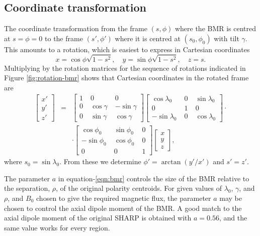 \subsection{Coordinate transformation}
The coordinate transformation from the frame $(s,\phi)$ where the BMR is centred at $s=\phi=0$ to the frame $(s',\phi')$ where it is centred at $(s_0,\phi_0)$ with tilt $\gamma$. This amounts to a rotation, which is easiest to express in Cartesian coordinates
\begin{equation}
x = \cos\phi\sqrt{1-s^2}, \quad y=\sin\phi\sqrt{1-s^2},\quad z=s.
\end{equation}
Multiplying by the rotation matrices for the sequence of rotations indicated in Figure \ref{fig:rotation-bmr} shows that Cartesian coordinates in the rotated frame are
\begin{eqnarray}\nonumber
\left[
\begin{array}{c}
x'\\
y'\\
z'
\end{array}
\right] &=&
\left[
\begin{array}{ccc}
1\; & 0\; & 0\\
0\; & \cos\gamma\; & -\sin\gamma\\
0\; & \sin\gamma\; & \cos\gamma
\end{array}
\right]
\left[
\begin{array}{ccc}
\cos\lambda_0\; & 0\; & \sin\lambda_0\\
0\; & 1\; & 0\\
-\sin\lambda_0\; & 0\; & \cos\lambda_0
\end{array}
\right]
\cdot\\ 
&&\cdot
\left[
\begin{array}{ccc}
\cos\phi_0\; & \sin\phi_0\; & 0\\
-\sin\phi_0\; & \cos\phi_0\; & 0\\
0 & 0 & 1
\end{array}
\right]
\left[
\begin{array}{c}
x\\
y\\
z
\end{array}
\right],
\label{eqn:rotation-trans}
\end{eqnarray}
where $s_0=\sin\lambda_0$. From these we determine $\phi'=\arctan(y'/x')$ and $s' = z'$.

The parameter $a$ in equation-\ref{eqn:bmr} controls the size of the BMR relative to the separation, $\rho$, of the original polarity centroids. For given values of $\lambda_0$, $\gamma$, and $\rho$, and $B_0$ chosen to give the required magnetic flux, the parameter $a$ may be chosen to control the axial dipole moment of the BMR. A good match to the axial dipole moment of the original SHARP is obtained with $a=0.56$, and the same value works for every region.

